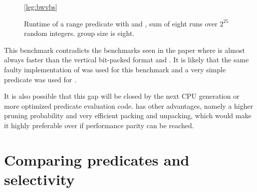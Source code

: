 \begin{figure}[h]
\begin{center}

\ref*{leg:bwvbs}
\end{center}
\caption{Runtime of a range predicate with \bwv{} and \bs{}, sum of eight
runs over $2^{25}$ random integers. \bwv{} group size is eight.}
\label{fig:eval:bwvbs}
\end{figure}

This benchmark contradicts the benchmarks seen in the \bs{} paper
\cite{ByteSlice} where \bs{} is almost always faster than the vertical
bit-packed format and \simdscan{}. It is likely that the same faulty
implementation of \simdscan{} was used for this benchmark and a very simple
predicate was used for \bs{}.

It is also possible that this gap will be closed by the next CPU generation or
more optimized predicate evaluation code.  \bs{} has other advantages, namely a
higher pruning probability and very efficient packing and unpacking, which would
make it highly preferable over \bwv{} if performance parity can be reached.

\section{Comparing predicates and selectivity}


